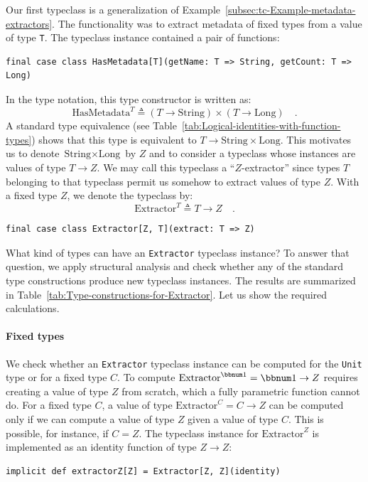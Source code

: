 Our first typeclass is a generalization of Example~\ref{subsec:tc-Example-metadata-extractors}.
The functionality was to extract metadata of fixed types from a value
of type \lstinline!T!. The typeclass instance contained a pair of
functions:
\begin{lstlisting}
final case class HasMetadata[T](getName: T => String, getCount: T => Long)
\end{lstlisting}
In the type notation, this type constructor is written as:
\[
\text{HasMetadata}^{T}\triangleq(T\rightarrow\text{String})\times(T\rightarrow\text{Long})\quad.
\]
A standard type equivalence (see Table~\ref{tab:Logical-identities-with-function-types})
shows that this type is equivalent to $T\rightarrow\text{String}\times\text{Long}$.
This motivates us to denote $\text{String}\times\text{Long}$ by $Z$
and to consider a typeclass whose instances are values of type $T\rightarrow Z$.
We may call this typeclass a \textsf{``}$Z$-extractor\textsf{''}
since types $T$ belonging to that typeclass permit us somehow to
extract values of type $Z$. With a fixed type $Z$, we denote the
typeclass by:
\[
\text{Extractor}^{T}\triangleq T\rightarrow Z\quad.
\]
\begin{lstlisting}
final case class Extractor[Z, T](extract: T => Z)
\end{lstlisting}
What kind of types can have an \lstinline!Extractor! typeclass instance?
To answer that question, we apply structural analysis and check whether
any of the standard type constructions produce new typeclass instances.
The results are summarized in Table~\ref{tab:Type-constructions-for-Extractor}.
Let us show the required calculations.

\paragraph{Fixed types}

We check whether an \lstinline!Extractor! typeclass instance can
be computed for the \lstinline!Unit! type or for a fixed type $C$.
To compute $\text{Extractor}^{\bbnum 1}=\bbnum 1\rightarrow Z$ requires
creating a value of type $Z$ from scratch, which a fully parametric
function cannot do. For a fixed type $C$, a value of type $\text{Extractor}^{C}=C\rightarrow Z$
can be computed only if we can compute a value of type $Z$ given
a value of type $C$. This is possible, for instance, if $C=Z$. The
typeclass instance for $\text{Extractor}^{Z}$ is implemented as an
identity function of type $Z\rightarrow Z$:
\begin{lstlisting}
implicit def extractorZ[Z] = Extractor[Z, Z](identity)
\end{lstlisting}


